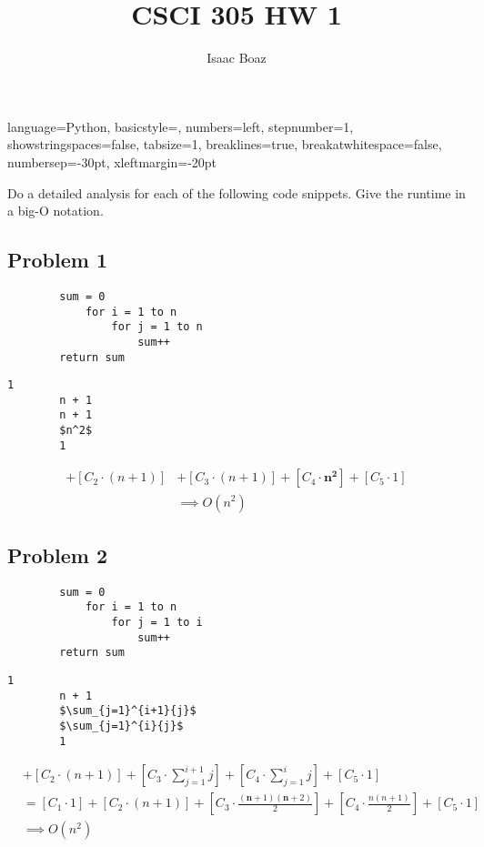 \documentclass{article}
\title{CSCI 305 HW 1}
\author{Isaac Boaz}
\begin{document}
\maketitle

\lstset
{ %
    language=Python,
    basicstyle=\footnotesize,
    numbers=left,
    stepnumber=1,
    showstringspaces=false,
    tabsize=1,
    breaklines=true,
    breakatwhitespace=false,
    numbersep=-30pt,
    xleftmargin=-20pt
}
\setlength{\columnseprule}{0.1pt}

Do a detailed analysis for each of the following code snippets. Give the runtime in a big-O notation.

\subsection*{Problem 1}
\begin{multicols}{2}
    \begin{lstlisting}
        sum = 0
            for i = 1 to n
                for j = 1 to n
                    sum++
        return sum
    \end{lstlisting}
    \columnbreak
    \begin{lstlisting}[numbers=none,mathescape]
        1
        n + 1
        n + 1
        $n^2$
        1
    \end{lstlisting}
\end{multicols}

\begin{align*}
    [C_1 \cdot 1]
    + [C_2 \cdot (n + 1)] &
    + [C_3 \cdot (n+1)]
    + [C_4 \cdot \mathbf{n^2}]
    + [C_5 \cdot 1]                         \\
                          & \implies O(n^2)
\end{align*}

\subsection*{Problem 2}
\begin{multicols}{2}
    \begin{lstlisting}
        sum = 0
            for i = 1 to n
                for j = 1 to i
                    sum++
        return sum
    \end{lstlisting}
    \columnbreak
    \begin{lstlisting}[numbers=none,mathescape]
        1
        n + 1
        $\sum_{j=1}^{i+1}{j}$
        $\sum_{j=1}^{i}{j}$
        1
    \end{lstlisting}
\end{multicols}

\begin{align*}
    [C_1 \cdot 1]
     & + [C_2 \cdot (n + 1)]
    + [C_3 \cdot \sum_{j=1}^{i+1}{j}]
    + [C_4 \cdot \sum_{j=1}^{i}{j}]
    + [C_5 \cdot 1]          \\
     & = [C_1 \cdot 1]
    + [C_2 \cdot (n + 1)]
    + [C_3 \cdot \frac{(\mathbf{n}+1)(\mathbf{n}+2)}{2}]
    + [C_4 \cdot \frac{n(n+1)}{2}]
    + [C_5 \cdot 1]          \\
     & \implies O(n^2)
\end{align*}
\end{document}
